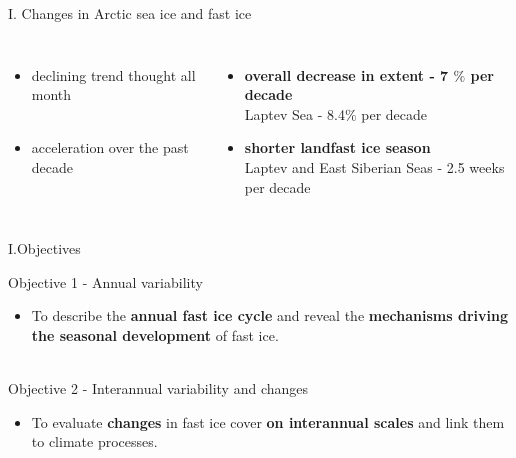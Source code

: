 \documentclass[8pt]{beamer}
\begin{document}
\begin{frame}[fragile]{I. Changes in Arctic sea ice and fast ice}
\begin{columns}
		
	\end{columns}
	
	\begin{columns}
		\begin{itemize}
			\item declining trend thought all month\\~\\
			\item acceleration over the past decade
		\end{itemize}
		\begin{itemize}
			\item \textbf{overall decrease in extent - 7 $\%$ per decade}\\
			Laptev Sea - 8.4$\%$ per decade
			
			\item \textbf{shorter landfast ice season\\}
			Laptev and East Siberian Seas - 2.5 weeks per decade
		\end{itemize}
	\end{columns}
	
\end{frame}


\setwatermark{\fontsize{125pt}{125pt}\selectfont{}}
\begin{frame}[fragile]{I.Objectives}
		
	Objective 1 -  Annual variability
		\begin{itemize}
			\item To describe the \textbf{annual fast ice cycle} and 
		reveal the \textbf{mechanisms driving the seasonal development} of fast ice.\\~\\
		\end{itemize}
	Objective 2 - Interannual variability and changes
		\begin{itemize}
			\item To evaluate \textbf{changes} in fast ice cover \textbf{on interannual scales} and 
		link them to climate processes.
		\end{itemize}

\end{frame}
\end{document}
